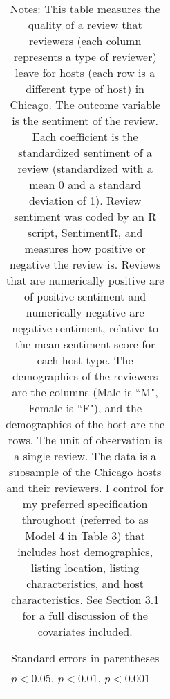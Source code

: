 \begin{sidewaystable}
{\begin{longtable}{l*{8}{c}}
\hline\hline
\multicolumn{9}{l}{\footnotesize Standard errors in parentheses}\\
\multicolumn{9}{l}{\footnotesize \sym{*} \(p<0.05\), \sym{**} \(p<0.01\), \sym{***} \(p<0.001\)}\\
\caption*{Notes: This table measures the quality of a review that reviewers (each column represents a type of reviewer) leave for hosts (each row is a different type of host) in Chicago. The outcome variable is the sentiment of the review. Each coefficient is the standardized sentiment of a review (standardized with a mean 0 and a standard deviation of 1). Review sentiment was coded by an R script, SentimentR, and measures how positive or negative the review is. Reviews that are numerically positive are of positive sentiment and numerically negative are negative sentiment, relative to the mean sentiment score for each host type. The demographics of the reviewers are the columns (Male is ``M", Female is ``F"), and the demographics of the host are the rows. The unit of observation is a single review. The data is a subsample of the Chicago hosts and their reviewers. I control for my preferred specification throughout (referred to as Model 4 in Table 3) that includes host demographics, listing location, listing characteristics, and host characteristics. See Section 3.1 for a full discussion of the covariates included.}
\end{longtable}
}

\end{sidewaystable}

